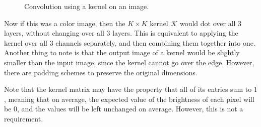 \documentclass{article}
\begin{document}
    \begin{figure}
    \centering
    \caption{Convolution using a kernel on an image.}
    \label{fig:convolution1}
    \end{figure}

    Now if this was a color image, then the $K \times K$ kernel $\mathcal{K}$ would dot over all 3 layers, without changing over all 3 layers. This is equivalent to applying the kernel over all 3 channels separately, and then combining them together into one. Another thing to note is that the output image of a kernel would be slightly smaller than the input image, since the kernel cannot go over the edge. However, there are padding schemes to preserve the original dimensions. 

    Note that the kernel matrix may have the property that all of its entries sum to $1$, meaning that on average, the expected value of the brightness of each pixel will be $0$, and the values will be left unchanged on average. However, this is not a requirement. 
\end{document}
